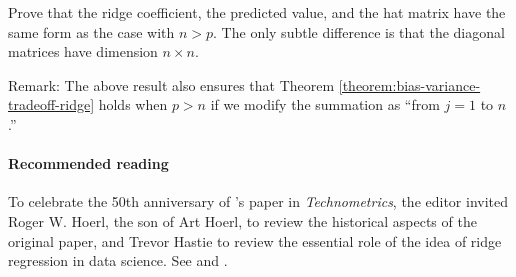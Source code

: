 Prove that the ridge coefficient, the predicted value, and the hat matrix have the same form as the case with $n>p$.  The only subtle difference is that the diagonal matrices have dimension $n\times n$. 

Remark: The above result also ensures that Theorem \ref{theorem:bias-variance-tradeoff-ridge} holds when $p > n$ if we modify the summation as ``from $j=1$ to $n$.'' 






 
\paragraph{Recommended reading}

To celebrate the 50th anniversary of  \citet{hoerl1970ridge}'s paper in {\it Technometrics}, the editor invited Roger W. Hoerl,  the son of Art Hoerl, to review the historical aspects of the original paper, and Trevor Hastie to review the essential role of the idea of ridge regression in data science. See \citet{hoerl2020ridge} and \citet{hastie2020ridge}. 
 
